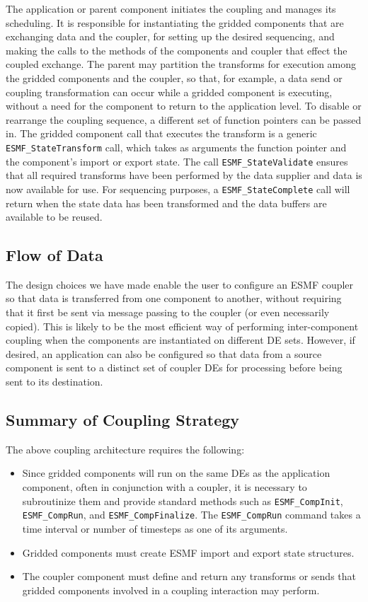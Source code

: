 The application or parent component initiates the coupling and manages 
its scheduling.  It is responsible for instantiating the gridded components
that are exchanging data and the coupler, for setting up the desired 
sequencing, and making the calls to the methods of the components and 
coupler that effect the coupled exchange.  The parent may partition the 
transforms
for execution among the gridded components and the coupler, so that, for 
example, a data send or coupling transformation can occur while a gridded 
component is executing, without a need for the component to return to the
application level.  
To disable or rearrange the coupling sequence, a different set of function
pointers can be passed in.  
The gridded component call that executes the transform
is a generic {\tt ESMF\_StateTransform} call, which takes as arguments the
function pointer and the component's import or export state. The
call {\tt ESMF\_StateValidate} ensures that all required transforms
have been performed by the data supplier and data is now available
for use.  For sequencing purposes, a {\tt ESMF\_StateComplete} call
will return when the state data has been transformed and the data
buffers are available to be reused.

\subsection{Flow of Data}

The design choices we have made enable the user to configure an ESMF
coupler so that data is transferred from one component to another, 
without requiring that it first be sent via message passing to the
coupler (or even necessarily
copied).  This is likely to be the most efficient way of performing 
inter-component coupling when the components are instantiated on different
DE sets.  However, if desired, an application can also be configured so that
data from a source component is sent to a distinct set of coupler 
DEs for processing before being sent to its destination.

\subsection{Summary of Coupling Strategy}

The above coupling architecture requires the following:
\begin{itemize}
\item Since gridded components will run on the same 
DEs as the application component, often in conjunction with a coupler, 
it is necessary to subroutinize
them and provide standard methods such as {\tt ESMF\_CompInit}, 
{\tt ESMF\_CompRun}, and {\tt ESMF\_CompFinalize}.  The {\tt ESMF\_CompRun}
command takes a time interval or number of timesteps as one of its 
arguments.
\item Gridded components must create ESMF import and export state 
structures.
\item The coupler component must define and return any transforms or 
sends that gridded components involved in a coupling interaction may 
perform.
\end{itemize}

